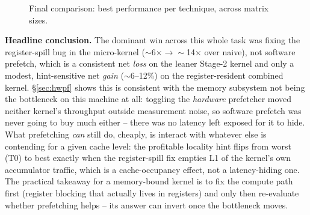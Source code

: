 \documentclass[11pt]{article}
\begin{document}
\begin{figure}[h]
\centering
{}
\caption{Final comparison: best performance per technique, across matrix sizes.}
\end{figure}

\textbf{Headline conclusion.} The dominant win across this whole task was fixing the
register-spill bug in the micro-kernel ($\sim$6$\times \to \sim$14$\times$ over naive),
not software prefetch, which is a consistent net \emph{loss} on the leaner Stage-2 kernel
and only a modest, hint-sensitive net \emph{gain} ($\sim$6--12\%) on the
register-resident combined kernel. \S\ref{sec:hwpf} shows this is consistent with the
memory subsystem not being the bottleneck on this machine at all: toggling the
\emph{hardware} prefetcher moved neither kernel's throughput outside measurement noise,
so software prefetch was never going to buy much either -- there was no latency left
exposed for it to hide. What prefetching \emph{can} still do, cheaply, is interact with
whatever else is contending for a given cache level: the profitable locality hint flips
from worst (T0) to best exactly when the register-spill fix empties L1 of the kernel's
own accumulator traffic, which is a cache-occupancy effect, not a latency-hiding one.
The practical takeaway for a memory-bound kernel is to fix the compute path first
(register blocking that actually lives in registers) and only then re-evaluate whether
prefetching helps -- its answer can invert once the bottleneck moves.
\end{document}
